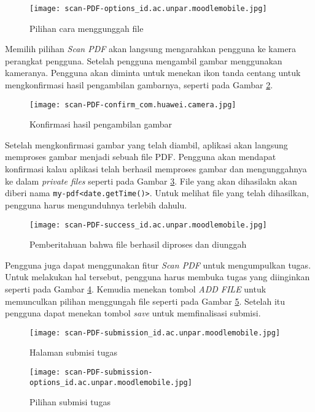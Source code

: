 \begin{figure}[H] 
	\centering  
	\texttt{[image: scan-PDF-options\_id.ac.unpar.moodlemobile.jpg]}  
	\caption[Pilihan cara menggunggah file] {Pilihan cara menggunggah file} 
	\label{app:menu:files:options} 
\end{figure}  

Memilih pilihan \textit{Scan PDF} akan langsung mengarahkan pengguna ke kamera perangkat pengguna. Setelah pengguna mengambil gambar menggunakan kameranya. Pengguna akan diminta untuk menekan ikon tanda centang untuk mengkonfirmasi hasil pengambilan gambarnya, seperti pada Gambar \ref{app:scanPDF:confirm}.

\begin{figure}[H] 
	\centering  
	\texttt{[image: scan-PDF-confirm\_com.huawei.camera.jpg]}  
	\caption[Konfirmasi hasil pengambilan gambar] {Konfirmasi hasil pengambilan gambar} 
	\label{app:scanPDF:confirm} 
\end{figure}  

Setelah mengkonfirmasi gambar yang telah diambil, aplikasi akan langsung memproses gambar menjadi sebuah file PDF. Pengguna akan mendapat konfirmasi kalau aplikasi telah berhasil memproses gambar dan mengunggahnya ke dalam \textit{private files} seperti pada Gambar \ref{app:scanPDF:success}. File yang akan dihasilakn akan diberi nama \texttt{my-pdf<date.getTime()>}. Untuk melihat file yang telah dihasilkan, pengguna harus mengunduhnya terlebih dahulu.

\begin{figure}[H] 
	\centering  
	\texttt{[image: scan-PDF-success\_id.ac.unpar.moodlemobile.jpg]}  
	\caption[Pemberitahuan bahwa file berhasil diproses dan diunggah] {Pemberitahuan bahwa file berhasil diproses dan diunggah} 
	\label{app:scanPDF:success} 
\end{figure}  

Pengguna juga dapat menggunakan fitur \textit{Scan PDF} untuk mengumpulkan tugas. Untuk melakukan hal tersebut, pengguna harus membuka tugas yang diinginkan seperti pada Gambar \ref{app:scanPDF:submission}. Kemudia menekan tombol \textit{ADD FILE} untuk memunculkan pilihan menggungah file seperti pada Gambar \ref{app:scanPDF:submission:options}. Setelah itu pengguna dapat menekan tombol \textit{save} untuk memfinalisasi submisi.

\begin{figure}[H] 
	\centering  
	\texttt{[image: scan-PDF-submission\_id.ac.unpar.moodlemobile.jpg]}  
	\caption[Halaman submisi tugas] {Halaman submisi tugas} 
	\label{app:scanPDF:submission} 
\end{figure}  

\begin{figure}[H] 
	\centering  
	\texttt{[image: scan-PDF-submission-options\_id.ac.unpar.moodlemobile.jpg]}  
	\caption[Pilihan submisi tugas] {Pilihan submisi tugas} 
	\label{app:scanPDF:submission:options} 
\end{figure}  

